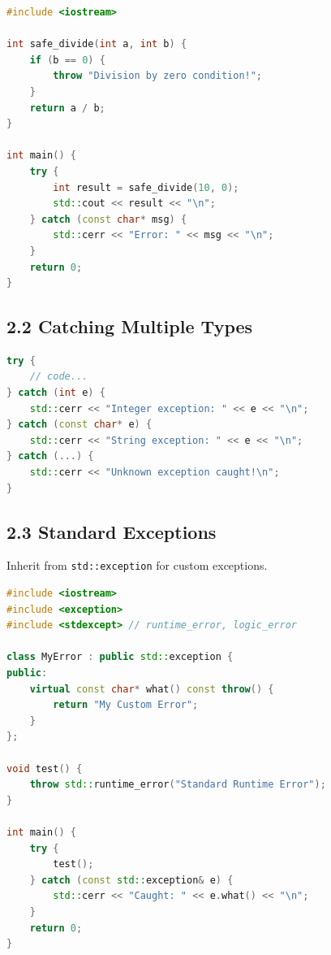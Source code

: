 \begin{lstlisting}[language={C++}]
#include <iostream>

int safe_divide(int a, int b) {
    if (b == 0) {
        throw "Division by zero condition!";
    }
    return a / b;
}

int main() {
    try {
        int result = safe_divide(10, 0);
        std::cout << result << "\n";
    } catch (const char* msg) {
        std::cerr << "Error: " << msg << "\n";
    }
    return 0;
}
\end{lstlisting}

\hypertarget{catching-multiple-types}{%
\subsection{2.2 Catching Multiple Types}\label{catching-multiple-types}}

\begin{lstlisting}[language={C++}]
try {
    // code...
} catch (int e) {
    std::cerr << "Integer exception: " << e << "\n";
} catch (const char* e) {
    std::cerr << "String exception: " << e << "\n";
} catch (...) {
    std::cerr << "Unknown exception caught!\n";
}
\end{lstlisting}

\hypertarget{standard-exceptions}{%
\subsection{2.3 Standard Exceptions}\label{standard-exceptions}}

Inherit from \passthrough{\lstinline!std::exception!} for custom
exceptions.

\begin{lstlisting}[language={C++}]
#include <iostream>
#include <exception>
#include <stdexcept> // runtime_error, logic_error

class MyError : public std::exception {
public:
    virtual const char* what() const throw() {
        return "My Custom Error";
    }
};

void test() {
    throw std::runtime_error("Standard Runtime Error");
}

int main() {
    try {
        test();
    } catch (const std::exception& e) {
        std::cerr << "Caught: " << e.what() << "\n";
    }
    return 0;
}
\end{lstlisting}

